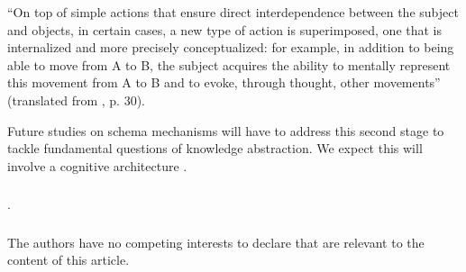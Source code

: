 \documentclass[runningheads]{llncs}
\begin{document}
\begin{adjustwidth}{1cm}{1cm}
``On top of simple actions that ensure direct interdependence between the subject and objects, in certain cases, a new type of action is superimposed, one that is internalized and more precisely conceptualized: for example, in addition to being able to move from A to B, the subject acquires the ability to mentally represent this movement from A to B and to evoke, through thought, other movements'' (translated from \cite{piaget_lepistemologie_2011}, p. 30).\\

\end{adjustwidth}

Future studies on schema mechanisms will have to address this second stage to tackle fundamental questions of knowledge abstraction. 
We expect this will involve a cognitive architecture \cite{georgeon_artificial_2024}. 


\begin{credits}
\subsubsection{\ackname} .

\subsubsection{\discintname}
The authors have no competing interests to declare that are
relevant to the content of this article.
\end{credits}
%
%
%


%
\end{document}
